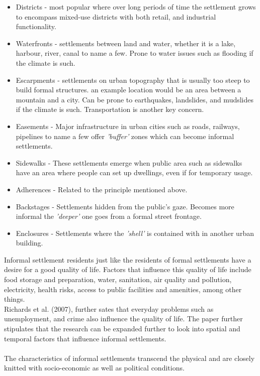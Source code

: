 \begin{itemize}
\item Districts - most popular where over long periods of time the settlement grows to encompass mixed-use districts with both retail, and industrial functionality.
\item Waterfronts - settlements between land and water, whether it is a lake, harbour, river, canal to name a few. Prone to water issues such as flooding if the climate is such.
\item Escarpments - settlements on urban topography that is usually too steep to build formal structures. an example location would be an area between a mountain and a city. Can be prone to earthquakes, landslides, and mudslides if the climate is such. Transportation is another key concern.
\item Easements - Major infrastructure in urban cities such as roads, railways, pipelines to name a few offer \textsl{'buffer'} zones which can become informal settlements.
\item Sidewalks - These settlements emerge when public area such as sidewalks have an area where people can set up dwellings, even if for temporary usage.
\item Adherences - Related to the principle mentioned above.
\item Backstages - Settlements hidden from the public's gaze. Becomes more informal the \textsl{'deeper'} one goes from a formal street frontage.
\item Enclosures - Settlements where the \textsl{'shell'} is contained with in another urban building.
\end{itemize}
Informal settlement residents just like the residents of formal settlements have a desire for a good quality of life. Factors that influence this quality of life include food storage and preparation, water, sanitation, air quality and pollution, electricity, health risks, access to public facilities and amenities, among other things.\citep{richards2007measuring}\\
Richards et al. (2007), further sates that everyday problems such as unemployment, and crime also influence the quality of life. The paper further stipulates that the research can be expanded further to look into spatial and temporal factors that influence informal settlements.\\\\
The characteristics of informal settlements transcend the physical and are closely knitted with socio-economic as well as political conditions.\citep{wekesa}
